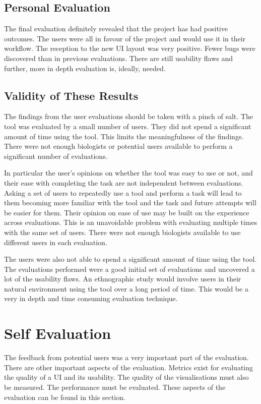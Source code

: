 \subsection{Personal Evaluation}

The final evaluation definitely revealed that the project has had positive outcomes.  The users were all in favour of the project and would use it in their workflow.  The reception to the new \ac{UI} layout was very positive.  Fewer bugs were discovered than in previous evaluations. There are still usability flaws and further, more in depth evaluation is, ideally, needed.

\subsection{Validity of These Results}
The findings from the user evaluations should be taken with a pinch of salt.  The tool was evaluated by a small number of users.  They did not spend a significant amount of time using the tool.  This limits the meaningfulness of the findings.  There were not enough biologists or potential users available to perform a significant number of evaluations.

In particular the user's opinions on whether the tool was easy to use or not, and their ease with completing the task are not independent between evaluations.  Asking a set of users to repeatedly use a tool and perform a task will lead to them becoming more familiar with the tool and the task and future attempts will be easier for them.  Their opinion on ease of use may be built on the experience across evaluations.  This is an unavoidable problem with evaluating multiple times with the same set of users.  There were not enough biologists available to use different users in each evaluation.

The users were also not able to spend a significant amount of time using the tool.  The evaluations performed were a good initial set of evaluations and uncovered a lot of the usability flaws.  An ethnographic study would involve users in their natural environment using the tool over a long period of time.  This would be a very in depth and time consuming evaluation technique.

\section{Self Evaluation}
The feedback from potential users was a very important part of the evaluation.  There are other important aspects of the evaluation.  Metrics exist for evaluating the quality of a \ac{UI} and its usability.  The quality of the visualisations must also be measured.  The performance must be evaluated.  These aspects of the evaluation can be found in this section.

